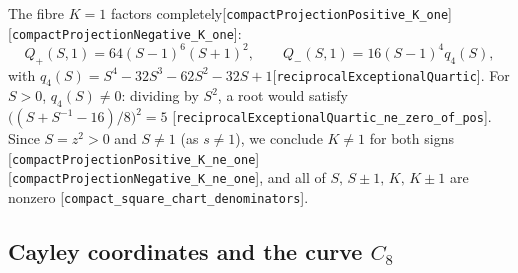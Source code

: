\documentclass[10pt]{article}
\theoremstyle{definition}
\theoremstyle{remark}
\newcommand{\leanref}[1]{{\scriptsize\textup{[\texttt{#1}]}}\allowbreak}
\begin{document}
The fibre $K=1$ factors completely\leanref{compact\allowbreak Projection\allowbreak Positive\_\allowbreak K\_\allowbreak one} \leanref{compact\allowbreak Projection\allowbreak Negative\_\allowbreak K\_\allowbreak one}:
\[
 Q_+(S,1)=64(S-1)^6(S+1)^2,\qquad Q_-(S,1)=16(S-1)^4q_4(S),
\]
with $q_4(S)=S^4-32S^3-62S^2-32S+1$\leanref{reciprocal\allowbreak Exceptional\allowbreak Quartic}.
For $S>0$, $q_4(S)\ne0$: dividing by $S^2$, a root would satisfy
$\bigl((S+S^{-1}-16)/8\bigr)^2=5$
\leanref{reciprocal\allowbreak Exceptional\allowbreak Quartic\_\allowbreak ne\_\allowbreak zero\_\allowbreak of\_\allowbreak pos}.  Since $S=z^2>0$ and
$S\ne1$ (as $s\ne1$), we conclude $K\ne1$ for both signs
\leanref{compact\allowbreak Projection\allowbreak Positive\_\allowbreak K\_\allowbreak ne\_\allowbreak one} \leanref{compact\allowbreak Projection\allowbreak Negative\_\allowbreak K\_\allowbreak ne\_\allowbreak one},
and all of $S,\,S\pm1,\,K,\,K\pm1$ are nonzero
\leanref{compact\_\allowbreak square\_\allowbreak chart\_\allowbreak denominators}.

\subsection{Cayley coordinates and the curve \texorpdfstring{$C_8$}{C8}}
\end{document}
